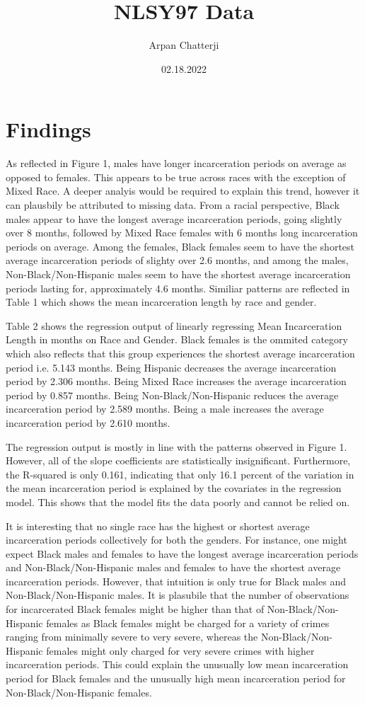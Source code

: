 \documentclass{article}
\author{Arpan Chatterji}
\title{NLSY97 Data}
\date{02.18.2022}
\begin{document}
\maketitle

\section{Findings}
As reflected in Figure 1, males have longer incarceration periods on average as opposed to females. This appears to be true across races with the exception of Mixed Race. A deeper analyis would be required to explain this trend, however it can plausbily be attributed to missing data. From a racial perspective, Black males appear to have the longest average incarceration periods, going slightly over 8 months, followed by Mixed Race females with 6 months long incarceration periods on average. Among the females, Black females seem to have the shortest average incarceration periods of slighty over 2.6 months, and among the males, Non-Black/Non-Hispanic males seem to have the shortest average incarceration periods lasting for, approximately 4.6 months. Similiar patterns are reflected in Table 1 which shows the mean incarceration length by race and gender.

Table 2 shows the regression output of linearly regressing Mean Incarceration Length in months on Race and Gender. Black females is the ommited category which also reflects that this group experiences the shortest average incarceration period i.e. 5.143 months. Being Hispanic decreases the average incarceration period by 2.306 months. Being Mixed Race increases the average incarceration period by 0.857 months. Being Non-Black/Non-Hispanic reduces the average incarceration period by 2.589 months. Being a male increases the average incarceration period by 2.610 months.

The regression output is mostly in line with the patterns observed in Figure 1. However, all of the slope coefficients are statistically insignificant. Furthermore, the R-squared is only 0.161, indicating that only 16.1 percent of the variation in the mean incarceration period is explained by the covariates in the regression model. This shows that the model fits the data poorly and cannot be relied on.

It is interesting that no single race has the highest or shortest average incarceration periods collectively for both the genders.
For instance, one might expect Black males and females to have the longest average incarceration periods and Non-Black/Non-Hispanic males and females to have the shortest average incarceration periods. However, that intuition is only true for Black males and Non-Black/Non-Hispanic males. It is plasubile that the number of observations for incarcerated Black females might be higher than that of Non-Black/Non-Hispanic females as Black females might be charged for a variety of crimes ranging from minimally severe to very severe, whereas the Non-Black/Non-Hispanic females might only charged for very severe crimes with higher incarceration periods. This could explain the unusually low mean incarceration period for Black females and the unusually high mean incarceration period for Non-Black/Non-Hispanic females.
\end{document}
